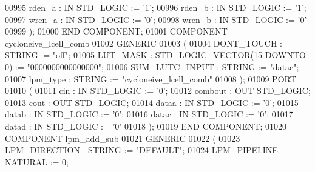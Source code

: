 \begin{DoxyCode}
{00995         rden\_a  :   \textcolor{keywordflow}{IN} \textcolor{comment}{STD\_LOGIC} := '\textcolor{vhdllogic}{}\textcolor{vhdllogic}{1}';
00996         rden\_b  :   \textcolor{keywordflow}{IN} \textcolor{comment}{STD\_LOGIC} := '\textcolor{vhdllogic}{}\textcolor{vhdllogic}{1}';
00997         wren\_a  :   \textcolor{keywordflow}{IN} \textcolor{comment}{STD\_LOGIC} := '\textcolor{vhdllogic}{}\textcolor{vhdllogic}{0}';
00998         wren\_b  :   \textcolor{keywordflow}{IN} \textcolor{comment}{STD\_LOGIC} := '\textcolor{vhdllogic}{}\textcolor{vhdllogic}{0}'
00999      ); 
01000      \textcolor{keywordflow}{END} \textcolor{keywordflow}{COMPONENT};
01001      \textcolor{keywordflow}{COMPONENT}  cycloneive\_lcell\_comb
01002      \textcolor{keywordflow}{GENERIC} 
01003      (
01004         DONT\_TOUCH  :   \textcolor{comment}{STRING} := \textcolor{keyword}{"off"};
01005         LUT\_MASK    :   \textcolor{comment}{STD\_LOGIC\_VECTOR}(\textcolor{vhdllogic}{}\textcolor{vhdllogic}{15} \textcolor{keywordflow}{DOWNTO} \textcolor{vhdllogic}{}\textcolor{vhdllogic}{0}) := "\textcolor{vhdllogic}{0000000000000000}";
01006         SUM\_LUTC\_INPUT  :   \textcolor{comment}{STRING} := \textcolor{keyword}{"datac"};
01007         lpm\_type    :   \textcolor{comment}{STRING} := \textcolor{keyword}{"cycloneive\_lcell\_comb"}
01008      );
01009      \textcolor{keywordflow}{PORT}
01010      ( 
01011         cin :   \textcolor{keywordflow}{IN} \textcolor{comment}{STD\_LOGIC} := '\textcolor{vhdllogic}{}\textcolor{vhdllogic}{0}';
01012         combout :   \textcolor{keywordflow}{OUT} \textcolor{comment}{STD\_LOGIC};
01013         cout    :   \textcolor{keywordflow}{OUT} \textcolor{comment}{STD\_LOGIC};
01014         dataa   :   \textcolor{keywordflow}{IN} \textcolor{comment}{STD\_LOGIC} := '\textcolor{vhdllogic}{}\textcolor{vhdllogic}{0}';
01015         datab   :   \textcolor{keywordflow}{IN} \textcolor{comment}{STD\_LOGIC} := '\textcolor{vhdllogic}{}\textcolor{vhdllogic}{0}';
01016         datac   :   \textcolor{keywordflow}{IN} \textcolor{comment}{STD\_LOGIC} := '\textcolor{vhdllogic}{}\textcolor{vhdllogic}{0}';
01017         datad   :   \textcolor{keywordflow}{IN} \textcolor{comment}{STD\_LOGIC} := '\textcolor{vhdllogic}{}\textcolor{vhdllogic}{0}'
01018      ); 
01019      \textcolor{keywordflow}{END} \textcolor{keywordflow}{COMPONENT};
01020      \textcolor{keywordflow}{COMPONENT}  lpm\_add\_sub
01021      \textcolor{keywordflow}{GENERIC} 
01022      (
01023         LPM\_DIRECTION   :   \textcolor{comment}{STRING} := \textcolor{keyword}{"DEFAULT"};
01024         LPM\_PIPELINE    :   \textcolor{comment}{NATURAL} := \textcolor{vhdllogic}{}\textcolor{vhdllogic}{0};
}
\end{DoxyCode}
